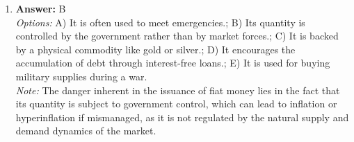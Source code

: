 \documentclass[12pt]{article}
\begin{document}
\begin{enumerate}[label=\arabic*.]
\\ \textit{Note:} When land has only a single use, it means that its value is derived solely from the economic rent it generates, as transfer earnings (the opportunity cost of using the land for its next best alternative) are zero due to the absence of alternative uses.
\item \textbf{Answer:} B
\\ \textit{Options:} A) It is often used to meet emergencies.; B) Its quantity is controlled by the government rather than by market forces.; C) It is backed by a physical commodity like gold or silver.; D) It encourages the accumulation of debt through interest-free loans.; E) It is used for buying military supplies during a war.
\\ \textit{Note:} The danger inherent in the issuance of fiat money lies in the fact that its quantity is subject to government control, which can lead to inflation or hyperinflation if mismanaged, as it is not regulated by the natural supply and demand dynamics of the market.
\end{enumerate}
\end{document}
